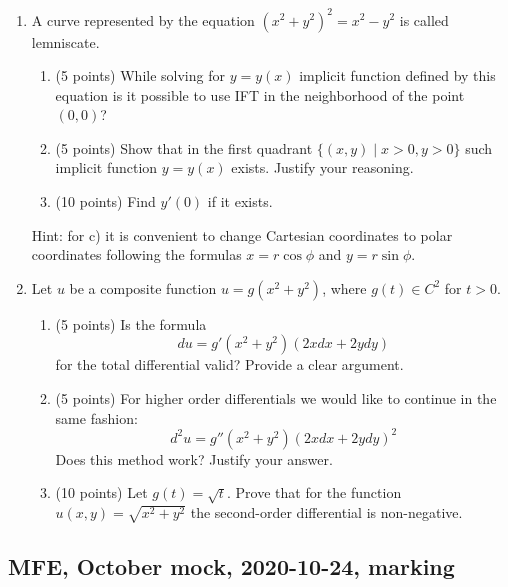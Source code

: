 \begin{enumerate}
\item 
A curve represented by the equation $(x^2 + y^2)^2 = x^2 - y^2$ is called lemniscate. 

\begin{enumerate}
  \item (5 points) While solving for $y=y(x)$ implicit function defined by this equation 
  is it possible to use IFT in the neighborhood of the point $(0,0)$?
  \item (5 points) Show that in the first quadrant $\{(x,y) \mid x>0, y>0 \}$ 
  such implicit function $y=y(x)$ exists. Justify your reasoning. 
  \item (10 points) Find $y'(0)$ if it exists. 
\end{enumerate}

Hint: for c) it is convenient  to change Cartesian coordinates to polar coordinates 
following the formulas $x=r\cos \phi$ and $y=r\sin \phi$.


\item Let $u$ be a composite function $u=g(x^2 + y^2)$, where $g(t) \in C^2$ for $t>0$. 

\begin{enumerate}
  \item (5 points) Is the formula 
  \[
du = g'(x^2 + y^2)(2xdx + 2ydy)
  \]
  for the total differential valid? Provide a clear argument. 
\item  (5 points) For higher order differentials we would like to continue in the same fashion:
\[
d^2u = g''(x^2 + y^2)(2xdx + 2ydy)^2
\]  
Does this method work? Justify your answer. 
\item (10 points) Let $g(t)=\sqrt{t}$. 
Prove that for the function $u(x,y)=\sqrt{x^2 + y^2}$ the second-order differential is non-negative.
\end{enumerate}

  


  
\end{enumerate}
  

\subsection{MFE, October mock, 2020-10-24, marking}


